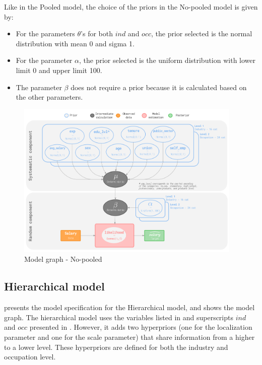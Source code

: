 Like in the Pooled model, the choice of the priors in the No-pooled model is given by: 
\begin{itemize}
    \item For the parameters $\theta$'s for both $ind$ and $occ$, the prior selected is the normal distribution with mean 0 and sigma 1. 

    \item For the parameter $\alpha$, the prior selected is the uniform distribution with lower limit 0 and upper limit 100. 
    
    \item The parameter $\beta$ does not require a prior because it is calculated based on the other parameters. 
\end{itemize}

\begin{figure}[H]
    \centering
    \includegraphics[width=0.96\textwidth]{images/ch5_no_pooled_graph/no_pooled_graph.png}
    \setlength{\abovecaptionskip}{-12pt}
    \caption{Model graph - No-pooled}
    \label{fig:model_graph_nopooled}
\end{figure}

\subsection{Hierarchical model}

 presents the model specification for the Hierarchical model, and  shows the model graph. The hierarchical model uses the variables listed in  and superscripts $ind$  and $occ$ presented in . However, it adds two hyperpriors (one for the localization parameter and one for the scale parameter) that share information from a higher to a lower level. These hyperpriors are defined for both the industry and occupation level.  

